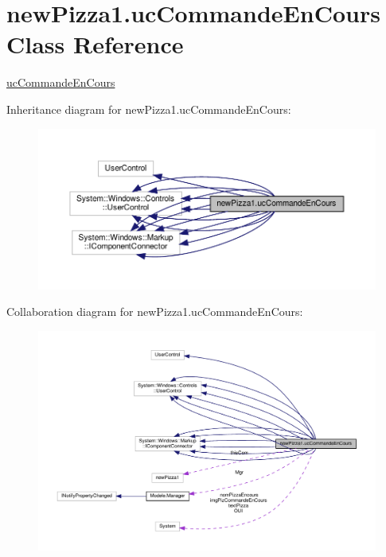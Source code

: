\hypertarget{classnewPizza1_1_1ucCommandeEnCours}{}\section{new\+Pizza1.\+uc\+Commande\+En\+Cours Class Reference}
\label{classnewPizza1_1_1ucCommandeEnCours}


\hyperlink{classnewPizza1_1_1ucCommandeEnCours}{uc\+Commande\+En\+Cours}  




Inheritance diagram for new\+Pizza1.\+uc\+Commande\+En\+Cours\+:
\nopagebreak
\begin{figure}[H]
\begin{center}
\leavevmode
\includegraphics[width=350pt]{classnewPizza1_1_1ucCommandeEnCours__inherit__graph}
\end{center}
\end{figure}


Collaboration diagram for new\+Pizza1.\+uc\+Commande\+En\+Cours\+:
\nopagebreak
\begin{figure}[H]
\begin{center}
\leavevmode
\includegraphics[width=350pt]{classnewPizza1_1_1ucCommandeEnCours__coll__graph}
\end{center}
\end{figure}
